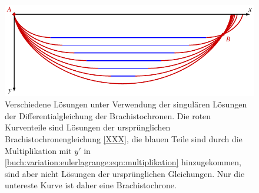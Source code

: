 %
%
%
\begin{figure}
\centering
\includegraphics{chapters/020-variation/images/singulaer.pdf}
\caption{Verschiedene Lösungen unter Verwendung der singulären Lösungen
der Differentialgleichung der Brachistochronen.
Die roten Kurventeile sind Lösungen der ursprünglichen
Brachistochronengleichung
\eqref{XXX},
die blauen Teile sind durch die Multiplikation mit $y'$ in
\eqref{buch:variation:eulerlagrange:eqn:multiplikation}
hinzugekommen, sind aber nicht Lösungen der ursprünglichen
Gleichungen.
Nur die untereste Kurve ist daher eine Brachistochrone.
\label{buch:variation:eulerlagrange:fig:brachloes}}
\end{figure}

